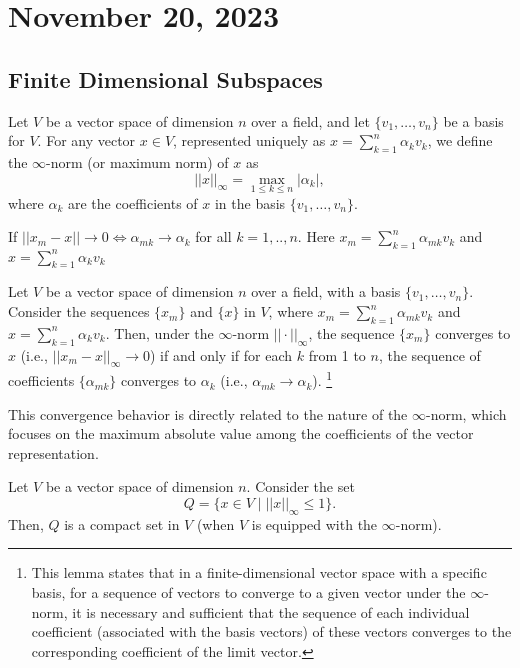 \newpage
\section{November 20, 2023}
\subsection{Finite Dimensional Subspaces}
Let \( V \) be a vector space of dimension \( n \) over a field, and let \( \{v_1, \ldots, v_n\} \) be a basis for \( V \). For any vector \( x \in V \), represented uniquely as \( x = \sum_{k=1}^{n} \alpha_k v_k \), we define the \(\infty\)-norm (or maximum norm) of \( x \) as 
\[ ||x||_{\infty} = \max_{1 \leq k \leq n} |\alpha_k|, \]
where \( \alpha_k \) are the coefficients of \( x \) in the basis \( \{v_1, \ldots, v_n\} \).

\begin{lemma}
    If $||x_m - x|| \to 0 \iff \alpha_{mk} \to \alpha_k$
    for all $k=1, ..,n$. Here $x_m = \sum_{k=1}^{n}\alpha_{mk}v_k$ and $x = \sum_{k=1}^{n}\alpha_k v_k$
\end{lemma}


\begin{lemma}
    Let \( V \) be a vector space of dimension \( n \) over a field, with a basis \( \{v_1, \ldots, v_n\} \). Consider the sequences \( \{x_m\} \) and \( \{x\} \) in \( V \), where \( x_m = \sum_{k=1}^{n}\alpha_{mk}v_k \) and \( x = \sum_{k=1}^{n}\alpha_k v_k \). Then, under the \(\infty\)-norm \( ||\cdot||_{\infty} \), the sequence \( \{x_m\} \) converges to \( x \) (i.e., \( ||x_m - x||_{\infty} \to 0 \)) if and only if for each \( k \) from 1 to \( n \), the sequence of coefficients \( \{\alpha_{mk}\} \) converges to \( \alpha_k \) (i.e., \( \alpha_{mk} \to \alpha_k \)).
    \footnote{This lemma states that in a finite-dimensional vector space with a specific basis, for a sequence of vectors to converge to a given vector under the \(\infty\)-norm, it is necessary and sufficient that the sequence of each individual coefficient (associated with the basis vectors) of these vectors converges to the corresponding coefficient of the limit vector.}
\end{lemma}
This convergence behavior is directly related to the nature of the \(\infty\)-norm, which focuses on the maximum absolute value among the coefficients of the vector representation.

\begin{theorem}
    Let \( V \) be a vector space of dimension \( n \). Consider the set
    \[
    Q = \{ x \in V \mid ||x||_{\infty} \leq 1 \}.
    \]
    Then, \( Q \) is a compact set in \( V \) (when \( V \) is equipped with the \(\infty\)-norm).
\end{theorem}


